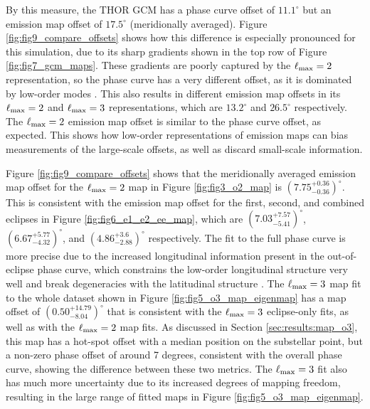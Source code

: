 \documentclass[twocolumn]{aastex631}
\begin{document}
By this measure, the THOR GCM has a phase curve offset of $11.1^{\circ}$ but an emission map offset of $17.5^{\circ}$ (meridionally averaged). Figure \ref{fig:fig9_compare_offsets} shows how this difference is especially pronounced for this simulation, due to its sharp gradients shown in the top row of Figure \ref{fig:fig7_gcm_maps}. These gradients are poorly captured by the $\ell_{\rm max}=2$ representation, so the phase curve has a very different offset, as it is dominated by low-order modes \citep{cowan2008inverting}. This also results in different emission map offsets in its $\ell_{\rm max}=2$ and $\ell_{\rm max}=3$ representations, which are $13.2^{\circ}$ and $26.5^{\circ}$ respectively. The $\ell_{\rm max}=2$ emission map offset is similar to the phase curve offset, as expected. This shows how low-order representations of emission maps can bias measurements of the large-scale offsets, as well as discard small-scale information. 

Figure \ref{fig:fig9_compare_offsets} shows that the meridionally averaged emission map offset for the $\ell_{\rm max}=2$ map in Figure \ref{fig:fig3_o2_map} is $(7.75^{+0.36}_{-0.36})^{\circ}$. This is consistent with the emission map offset for the first, second, and combined eclipses in Figure \ref{fig:fig6_e1_e2_ee_map}, which are $( 7.03 ^{+ 7.57 } _{- 5.41 })^{\circ}$, $( 6.67 ^{+ 5.77 } _{- 4.32 })^{\circ}$, and $( 4.86 ^{+ 3.6 } _{- 2.88 })^{\circ}$ respectively. The fit to the full phase curve is more precise due to the increased longitudinal information present in the out-of-eclipse phase curve, which constrains the low-order longitudinal structure very well and break degeneracies with the latitudinal structure \citep{boone2023analytic}. The $\ell_{\rm max}=3$ map fit to the whole dataset shown in Figure \ref{fig:fig5_o3_map_eigenmap} has a map offset of $( 0.50 ^{+ 14.79 } _{- 8.04 })^{\circ}$ that is consistent with the $\ell_{\rm max}=3$ eclipse-only fits, as well as with the $\ell_{\rm max}=2$ map fits. As discussed in Section \ref{sec:results:map_o3}, this map has a hot-spot offset with a median position on the substellar point, but a non-zero phase offset of around 7 degrees, consistent with the overall phase curve, showing the difference between these two metrics. The $\ell_{\rm max}=3$ fit also has much more uncertainty due to its increased degrees of mapping freedom, resulting in the large range of fitted maps in Figure \ref{fig:fig5_o3_map_eigenmap}.
\end{document}
